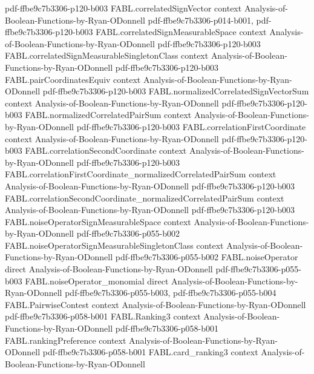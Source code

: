 \begin{theorem}
  {pdf-ffbe9c7b3306-p120-b003}
\proofstep
  {FABL.correlatedSignVector}
  {context}
  {Analysis-of-Boolean-Functions-by-Ryan-ODonnell}
  {pdf-ffbe9c7b3306-p014-b001,
    pdf-ffbe9c7b3306-p120-b003}
\proofstep
  {FABL.correlatedSignMeasurableSpace}
  {context}
  {Analysis-of-Boolean-Functions-by-Ryan-ODonnell}
  {pdf-ffbe9c7b3306-p120-b003}
\proofstep
  {FABL.correlatedSignMeasurableSingletonClass}
  {context}
  {Analysis-of-Boolean-Functions-by-Ryan-ODonnell}
  {pdf-ffbe9c7b3306-p120-b003}
\proofstep
  {FABL.pairCoordinatesEquiv}
  {context}
  {Analysis-of-Boolean-Functions-by-Ryan-ODonnell}
  {pdf-ffbe9c7b3306-p120-b003}
\proofstep
  {FABL.normalizedCorrelatedSignVectorSum}
  {context}
  {Analysis-of-Boolean-Functions-by-Ryan-ODonnell}
  {pdf-ffbe9c7b3306-p120-b003}
\proofstep
  {FABL.normalizedCorrelatedPairSum}
  {context}
  {Analysis-of-Boolean-Functions-by-Ryan-ODonnell}
  {pdf-ffbe9c7b3306-p120-b003}
\proofstep
  {FABL.correlationFirstCoordinate}
  {context}
  {Analysis-of-Boolean-Functions-by-Ryan-ODonnell}
  {pdf-ffbe9c7b3306-p120-b003}
\proofstep
  {FABL.correlationSecondCoordinate}
  {context}
  {Analysis-of-Boolean-Functions-by-Ryan-ODonnell}
  {pdf-ffbe9c7b3306-p120-b003}
\proofstep
  {FABL.correlationFirstCoordinate_normalizedCorrelatedPairSum}
  {context}
  {Analysis-of-Boolean-Functions-by-Ryan-ODonnell}
  {pdf-ffbe9c7b3306-p120-b003}
\proofstep
  {FABL.correlationSecondCoordinate_normalizedCorrelatedPairSum}
  {context}
  {Analysis-of-Boolean-Functions-by-Ryan-ODonnell}
  {pdf-ffbe9c7b3306-p120-b003}
\proofstep
  {FABL.noiseOperatorSignMeasurableSpace}
  {context}
  {Analysis-of-Boolean-Functions-by-Ryan-ODonnell}
  {pdf-ffbe9c7b3306-p055-b002}
\proofstep
  {FABL.noiseOperatorSignMeasurableSingletonClass}
  {context}
  {Analysis-of-Boolean-Functions-by-Ryan-ODonnell}
  {pdf-ffbe9c7b3306-p055-b002}
\proofstep
  {FABL.noiseOperator}
  {direct}
  {Analysis-of-Boolean-Functions-by-Ryan-ODonnell}
  {pdf-ffbe9c7b3306-p055-b003}
\proofstep
  {FABL.noiseOperator_monomial}
  {direct}
  {Analysis-of-Boolean-Functions-by-Ryan-ODonnell}
  {pdf-ffbe9c7b3306-p055-b003,
    pdf-ffbe9c7b3306-p055-b004}
\proofstep
  {FABL.PairwiseContest}
  {context}
  {Analysis-of-Boolean-Functions-by-Ryan-ODonnell}
  {pdf-ffbe9c7b3306-p058-b001}
\proofstep
  {FABL.Ranking3}
  {context}
  {Analysis-of-Boolean-Functions-by-Ryan-ODonnell}
  {pdf-ffbe9c7b3306-p058-b001}
\proofstep
  {FABL.rankingPreference}
  {context}
  {Analysis-of-Boolean-Functions-by-Ryan-ODonnell}
  {pdf-ffbe9c7b3306-p058-b001}
\proofstep
  {FABL.card_ranking3}
  {context}
  {Analysis-of-Boolean-Functions-by-Ryan-ODonnell}

\end{theorem}
